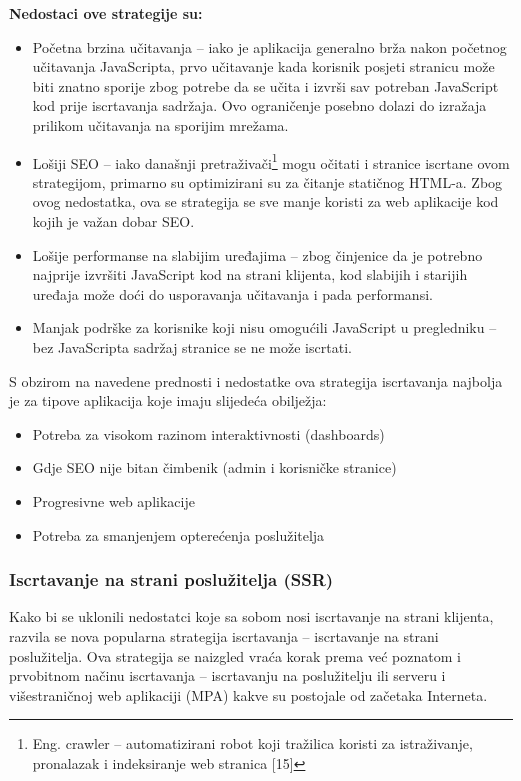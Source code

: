 \bigskip

\textbf{Nedostaci ove strategije su:}

\begin{itemize}
    \item Početna brzina učitavanja – iako je aplikacija generalno brža nakon početnog učitavanja JavaScripta, prvo učitavanje kada korisnik posjeti stranicu može biti znatno sporije zbog potrebe da se učita i izvrši sav potreban JavaScript kod prije iscrtavanja sadržaja. Ovo ograničenje posebno dolazi do izražaja prilikom učitavanja na sporijim mrežama.
    \item Lošiji SEO – iako današnji pretraživači\footnote{Eng. crawler – automatizirani robot koji tražilica koristi za istraživanje, pronalazak i indeksiranje web stranica [15]} mogu očitati i stranice iscrtane ovom strategijom, primarno su optimizirani su za čitanje statičnog HTML-a. Zbog ovog nedostatka, ova se strategija se sve manje koristi za web aplikacije kod kojih je važan dobar SEO.
    \item Lošije performanse na slabijim uređajima – zbog činjenice da je potrebno najprije izvršiti JavaScript kod na strani klijenta, kod slabijih i starijih uređaja može doći do usporavanja učitavanja i pada performansi.
    \item Manjak podrške za korisnike koji nisu omogućili JavaScript u pregledniku – bez JavaScripta sadržaj stranice se ne može iscrtati.
\end{itemize}

S obzirom na navedene prednosti i nedostatke ova strategija iscrtavanja najbolja je za tipove aplikacija koje imaju slijedeća obilježja:
\begin{itemize}
    \item Potreba za visokom razinom interaktivnosti (dashboards)
    \item Gdje SEO nije bitan čimbenik (admin i korisničke stranice)
    \item Progresivne web aplikacije
    \item Potreba za smanjenjem opterećenja poslužitelja
\end{itemize}
\vfill

\subsubsection{Iscrtavanje na strani poslužitelja (SSR)}

Kako bi se uklonili nedostatci koje sa sobom nosi iscrtavanje na strani klijenta, razvila se nova popularna strategija iscrtavanja – iscrtavanje na strani poslužitelja. Ova strategija se naizgled vraća korak prema već poznatom i prvobitnom načinu iscrtavanja – iscrtavanju na poslužitelju ili serveru i višestraničnoj web aplikaciji (MPA) kakve su postojale od začetaka Interneta.

